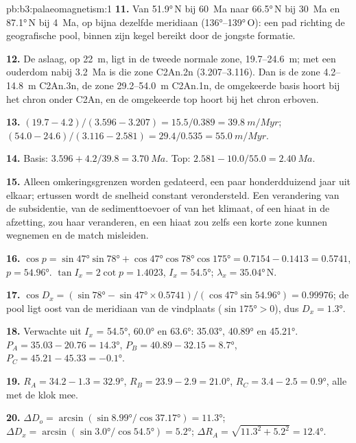 \begin{solution}{pb:b3:palaeomagnetism:1}
\textbf{11.} Van \ang{51.9}\,N bij \qty{60}{Ma} naar \ang{66.5}\,N bij
\qty{30}{Ma} en \ang{87.1}\,N bij \qty{4}{Ma}, op bijna dezelfde meridiaan
(\ang{136}--\ang{139}\,O): een pad richting de geografische pool, binnen zijn
kegel bereikt door de jongste formatie.

\textbf{12.} De aslaag, op \qty{22}{m}, ligt in de tweede normale zone,
19.7--\qty{24.6}{m}; met een ouderdom nabij \qty{3.2}{Ma} is die zone C2An.2n
(3.207--3.116). Dan is de zone 4.2--\qty{14.8}{m} C2An.3n, de zone
29.2--\qty{54.0}{m} C2An.1n, de omgekeerde basis hoort bij het chron onder
C2An, en de omgekeerde top hoort bij het chron erboven.

\textbf{13.} $(19.7 - 4.2)/(3.596 - 3.207) = 15.5/0.389 = \qty{39.8}{m/Myr}$;
$(54.0 - 24.6)/(3.116 - 2.581) = 29.4/0.535 = \qty{55.0}{m/Myr}$.

\textbf{14.} Basis: $3.596 + 4.2/39.8 = \qty{3.70}{Ma}$. Top: $2.581 -
10.0/55.0 = \qty{2.40}{Ma}$.

\textbf{15.} Alleen omkeringsgrenzen worden gedateerd, een paar honderdduizend jaar
uit elkaar; ertussen wordt de snelheid constant verondersteld. Een verandering van de subsidentie, van
de sedimenttoevoer of van het klimaat, of een hiaat in de afzetting, zou haar veranderen, en een
hiaat zou zelfs een korte zone kunnen wegnemen en de match misleiden.

\textbf{16.} $\cos p = \sin\ang{47}\sin\ang{78} + \cos\ang{47}\cos\ang{78}
\cos\ang{175} = 0.7154 - 0.1413 = 0.5741$, $p = \ang{54.96}$. $\tan I_x =
2\cot p = 1.4023$, $I_x = \ang{54.5}$; $\lambda_x = \ang{35.04}$\,N.

\textbf{17.} $\cos D_x = (\sin\ang{78} - \sin\ang{47}\times0.5741)/
(\cos\ang{47}\sin\ang{54.96}) = 0.99976$; de pool ligt oost van de
meridiaan van de vindplaats ($\sin\ang{175} > 0$), dus $D_x = \ang{1.3}$.

\textbf{18.} Verwachte  uit $I_x$ = \ang{54.5}, \ang{60.0} en
\ang{63.6}: \ang{35.03}, \ang{40.89} en \ang{45.21}. $P_A = 35.03 - 20.76 =
\ang{14.3}$, $P_B = 40.89 - 32.15 = \ang{8.7}$, $P_C = 45.21 - 45.33 =
\ang{-0.1}$.

\textbf{19.} $R_A = 34.2 - 1.3 = \ang{32.9}$, $R_B = 23.9 - 2.9 = \ang{21.0}$,
$R_C = 3.4 - 2.5 = \ang{0.9}$, alle met de klok mee.

\textbf{20.} $\Delta D_o = \arcsin(\sin\ang{8.99}/\cos\ang{37.17}) = \ang{11.3}$;
$\Delta D_x = \arcsin(\sin\ang{3.0}/\cos\ang{54.5}) = \ang{5.2}$; $\Delta R_A =
\sqrt{11.3^2 + 5.2^2} = \ang{12.4}$.


\end{solution}

